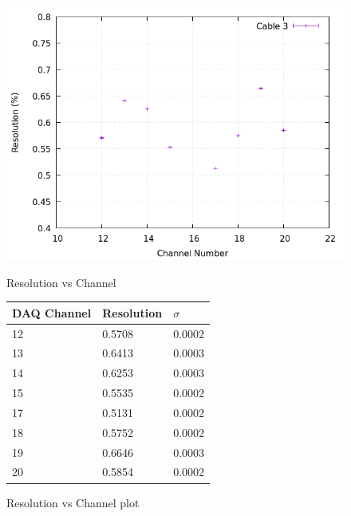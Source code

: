 \begin{figure}[h]
  \centering
  \begin{minipage}[b]{0.45\textwidth}
    \includegraphics[width=\textwidth]{img/plot/am/3_res_am.png}
    \caption{Resolution vs Channel}
    \label{res:am3}
  \end{minipage}
  \hfill
  \begin{minipage}[b]{0.45\textwidth}
  \begin{tabular}{lll}
    DAQ Channel & Resolution & $\sigma$ \\
    \midrule
    12 & \num{0.5708} & 0.0002 \\
    13 & \num{0.6413} & 0.0003 \\
    14 & \num{0.6253} & 0.0003 \\
    15 & \num{0.5535} & 0.0002 \\
    17 & \num{0.5131} & 0.0002 \\
    18 & \num{0.5752} & 0.0002 \\
    19 & \num{0.6646} & 0.0003 \\
    20 & \num{0.5854} & 0.0002 \\
    \bottomrule
  \end{tabular}
  \caption{Resolution vs Channel plot}
  \label{res:plot:am3}
  \end{minipage}
\end{figure}